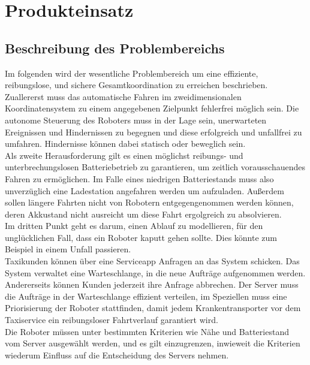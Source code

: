 
	\section{Produkteinsatz}
	
	\subsection{Beschreibung des Problembereichs}
	Im folgenden wird der wesentliche Problembereich um eine effiziente, reibungslose, und sichere Gesamtkoordination zu erreichen beschrieben.\\

Zuallererst muss das automatische Fahren im zweidimensionalen Koordinatensystem zu einem angegebenen Zielpunkt fehlerfrei möglich sein. 
	Die autonome Steuerung des Roboters muss in der Lage sein, unerwarteten Ereignissen und Hindernissen zu begegnen und diese erfolgreich und unfallfrei zu umfahren. Hindernisse können dabei statisch oder beweglich sein.\\
	
Als zweite Herausforderung gilt es einen möglichst reibungs- und unterbrechungslosen Batteriebetrieb zu garantieren, um zeitlich vorausschauendes Fahren zu ermöglichen. Im Falle eines niedrigen Batteriestands muss also unverzüglich eine Ladestation angefahren werden um aufzuladen. Außerdem sollen längere Fahrten nicht von Robotern entgegengenommen werden können, deren Akkustand nicht ausreicht um diese Fahrt ergolgreich zu absolvieren.\\

Im dritten Punkt geht es darum, einen Ablauf zu modellieren, für den unglücklichen Fall, dass ein Roboter kaputt gehen sollte. Dies könnte zum Beispiel in einem Unfall passieren.\\

Taxikunden können über eine Serviceapp Anfragen an das System schicken. Das System verwaltet eine Warteschlange, in die neue Aufträge aufgenommen werden. Andererseits können Kunden jederzeit ihre Anfrage abbrechen. Der Server muss die Aufträge in der Warteschlange effizient verteilen, im Speziellen muss eine Priorisierung der Roboter stattfinden, damit jedem Krankentransporter vor dem Taxiservice ein reibungsloser Fahrtverlauf garantiert wird.\\

Die Roboter müssen unter bestimmten Kriterien wie Nähe und Batteriestand vom Server ausgewählt werden, und es gilt einzugrenzen, inwieweit die Kriterien wiederum Einfluss auf die Entscheidung des Servers nehmen.\\

